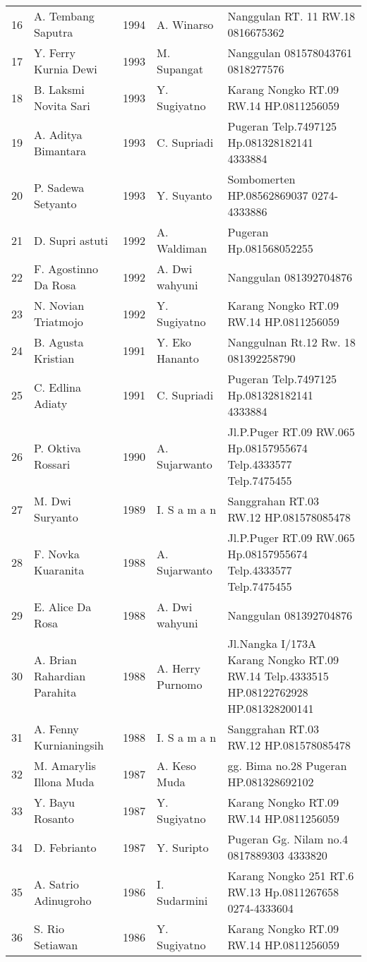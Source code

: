 \begin{longtable}{|r|p{2.75cm}|p{0.75cm}|p{2.75cm}|p{3cm}|}
16&A. Tembang Saputra&1994&A. Winarso&Nanggulan RT. 11 RW.18 0816675362\\
17&Y. Ferry Kurnia Dewi&1993&M. Supangat&Nanggulan 081578043761 0818277576\\
18&B. Laksmi Novita Sari&1993&Y. Sugiyatno&Karang Nongko RT.09 RW.14 HP.0811256059\\
19&A. Aditya Bimantara&1993&C. Supriadi&Pugeran Telp.7497125 Hp.081328182141 4333884\\
20&P. Sadewa Setyanto&1993&Y. Suyanto&Sombomerten HP.08562869037 0274-4333886\\
21&D. Supri astuti&1992&A. Waldiman&Pugeran Hp.081568052255\\
22&F. Agostinno Da Rosa&1992&A. Dwi wahyuni&Nanggulan 081392704876\\
23&N. Novian Triatmojo&1992&Y. Sugiyatno&Karang Nongko RT.09 RW.14 HP.0811256059\\
24&B. Agusta Kristian&1991&Y. Eko Hananto&Nanggulnan Rt.12 Rw. 18 081392258790\\
25&C. Edlina Adiaty&1991&C. Supriadi&Pugeran Telp.7497125 Hp.081328182141 4333884\\
26&P. Oktiva Rossari&1990&A. Sujarwanto&Jl.P.Puger RT.09 RW.065 Hp.08157955674 Telp.4333577 Telp.7475455\\
27&M. Dwi Suryanto&1989&I. S a m a n&Sanggrahan RT.03 RW.12 HP.081578085478\\
28&F. Novka Kuaranita&1988&A. Sujarwanto&Jl.P.Puger RT.09 RW.065 Hp.08157955674 Telp.4333577 Telp.7475455\\
29&E. Alice Da Rosa&1988&A. Dwi wahyuni&Nanggulan 081392704876\\
30&A. Brian Rahardian Parahita&1988&A. Herry Purnomo&Jl.Nangka I/173A Karang Nongko RT.09 RW.14 Telp.4333515 HP.08122762928 HP.081328200141\\
31&A. Fenny Kurnianingsih&1988&I. S a m a n&Sanggrahan RT.03 RW.12 HP.081578085478\\
32&M. Amarylis Illona Muda&1987&A. Keso Muda&gg. Bima no.28 Pugeran HP.081328692102\\
33&Y. Bayu Rosanto&1987&Y. Sugiyatno&Karang Nongko RT.09 RW.14 HP.0811256059\\
34&D. Febrianto&1987&Y. Suripto&Pugeran Gg. Nilam no.4 0817889303 4333820\\
35&A. Satrio Adinugroho&1986&I. Sudarmini&Karang Nongko 251 RT.6 RW.13 Hp.0811267658 0274-4333604\\
36&S. Rio Setiawan&1986&Y. Sugiyatno&Karang Nongko RT.09 RW.14 HP.0811256059\\

\end{longtable}
